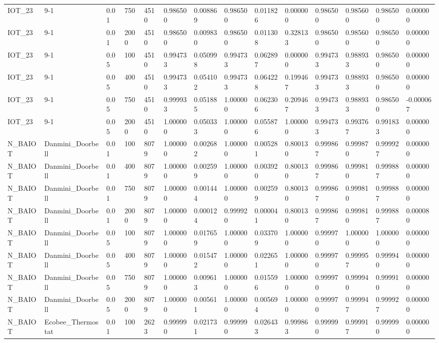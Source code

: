 \begin{tabular}{llllllllllllll}
IOT\_23 & 9-1 & 0.01 & 750 & 4510 & 0.986500 & 0.008869 & 0.986500 & 0.011826 & 0.000000 & 0.986500 & 0.985600 & 0.986500 & 0.000000 \\
IOT\_23 & 9-1 & 0.01 & 2000 & 4510 & 0.986500 & 0.009830 & 0.986500 & 0.011308 & 0.328133 & 0.986500 & 0.985600 & 0.986500 & 0.000000 \\
IOT\_23 & 9-1 & 0.05 & 100 & 4510 & 0.994733 & 0.050998 & 0.994733 & 0.062897 & 0.000000 & 0.994733 & 0.988933 & 0.986500 & 0.000000 \\
IOT\_23 & 9-1 & 0.05 & 400 & 4510 & 0.994733 & 0.054102 & 0.994733 & 0.064228 & 0.199467 & 0.994733 & 0.988933 & 0.986500 & 0.000000 \\
IOT\_23 & 9-1 & 0.05 & 750 & 4510 & 0.999933 & 0.051885 & 1.000000 & 0.062306 & 0.209467 & 0.994733 & 0.988933 & 0.986500 & -0.000067 \\
IOT\_23 & 9-1 & 0.05 & 2000 & 4510 & 1.000000 & 0.050333 & 1.000000 & 0.055876 & 1.000000 & 0.994733 & 0.993767 & 0.991833 & 0.000000 \\
N\_BAIOT & Danmini\_Doorbell & 0.01 & 100 & 8079 & 1.000000 & 0.002682 & 1.000000 & 0.005281 & 0.800130 & 0.999867 & 0.999870 & 0.999927 & 0.000000 \\
N\_BAIOT & Danmini\_Doorbell & 0.01 & 400 & 8079 & 1.000000 & 0.002599 & 1.000000 & 0.003920 & 0.800130 & 0.999867 & 0.999810 & 0.999887 & 0.000000 \\
N\_BAIOT & Danmini\_Doorbell & 0.01 & 750 & 8079 & 1.000000 & 0.001444 & 1.000000 & 0.002599 & 0.800130 & 0.999867 & 0.999810 & 0.999887 & 0.000000 \\
N\_BAIOT & Danmini\_Doorbell & 0.01 & 2000 & 8079 & 1.000000 & 0.000124 & 0.999920 & 0.000041 & 0.800130 & 0.999867 & 0.999810 & 0.999887 & 0.000080 \\
N\_BAIOT & Danmini\_Doorbell & 0.05 & 100 & 8079 & 1.000000 & 0.017659 & 1.000000 & 0.033709 & 1.000000 & 0.999970 & 1.000000 & 1.000000 & 0.000000 \\
N\_BAIOT & Danmini\_Doorbell & 0.05 & 400 & 8079 & 1.000000 & 0.015472 & 1.000000 & 0.022651 & 1.000000 & 0.999970 & 0.999957 & 0.999940 & 0.000000 \\
N\_BAIOT & Danmini\_Doorbell & 0.05 & 750 & 8079 & 1.000000 & 0.009613 & 1.000000 & 0.015596 & 1.000000 & 0.999970 & 0.999940 & 0.999910 & 0.000000 \\
N\_BAIOT & Danmini\_Doorbell & 0.05 & 2000 & 8079 & 1.000000 & 0.005611 & 1.000000 & 0.005694 & 1.000000 & 0.999970 & 0.999947 & 0.999927 & 0.000000 \\
N\_BAIOT & Ecobee\_Thermostat & 0.01 & 100 & 2623 & 0.999990 & 0.021731 & 0.999990 & 0.026433 & 0.999863 & 0.999990 & 0.999917 & 0.999990 & 0.000000 \\

\end{tabular}
